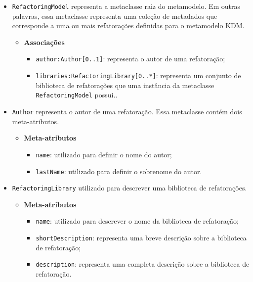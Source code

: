 \begin{itemize}
\item \texttt{RefactoringModel} representa a metaclasse raiz do metamodelo. Em outras palavras, essa metaclasse representa uma coleção de metadados que corresponde a uma ou mais refatorações definidas para o metamodelo KDM.

\begin{itemize}
	\item \textbf{Associações}
		\begin{itemize}
			\item \texttt{author:Author[0..1]}: representa o autor de uma refatoração; 
			\item \texttt{libraries:RefactoringLibrary[0..*]}: representa um conjunto de biblioteca de refatorações que uma instância da metaclasse \texttt{RefactoringModel} possui..
		\end{itemize}
\end{itemize}

\item \texttt{Author} representa o autor de uma refatoração. Essa metaclasse contém dois meta-atributos.

\begin{itemize}
	\item \textbf{Meta-atributos}
		\begin{itemize}
			\item \texttt{name}: utilizado para definir o nome do autor;
			\item \texttt{lastName}: utilizado para definir o sobrenome do autor.
		\end{itemize}	
\end{itemize} 

\item \texttt{RefactoringLibrary} utilizado para descrever uma biblioteca de refatorações.

\begin{itemize}
	\item \textbf{Meta-atributos}
		\begin{itemize}
			\item \texttt{name}: utilizado para descrever o nome da biblioteca de refatoração;
			\item \texttt{shortDescription}: representa uma breve descrição sobre a biblioteca de refatoração;
			\item \texttt{description}: representa uma completa descrição sobre a biblioteca de refatoração.
		\end{itemize}	
\end{itemize} 


\end{itemize}
